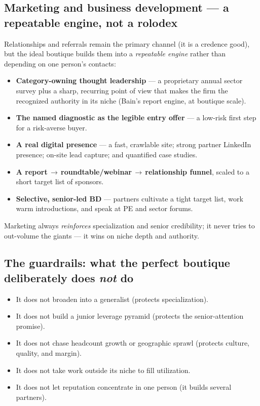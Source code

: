 \documentclass[11pt]{article}
\begin{document}
\subsection{Marketing and business development --- a repeatable engine, not a rolodex}
Relationships and referrals remain the primary channel (it is a credence good), but the
ideal boutique builds them into a \emph{repeatable engine} rather than depending on one
person's contacts:
\begin{itemize}
  \item \textbf{Category-owning thought leadership} --- a proprietary annual sector survey
  plus a sharp, recurring point of view that makes the firm the recognized authority in its
  niche (Bain's report engine, at boutique scale).
  \item \textbf{The named diagnostic as the legible entry offer} --- a low-risk first step
  for a risk-averse buyer.
  \item \textbf{A real digital presence} --- a fast, crawlable site; strong partner LinkedIn
  presence; on-site lead capture; and quantified case studies.
  \item \textbf{A report\,$\to$\,roundtable/webinar\,$\to$\,relationship funnel}, scaled to
  a short target list of sponsors.
  \item \textbf{Selective, senior-led BD} --- partners cultivate a tight target list, work
  warm introductions, and speak at PE and sector forums.
\end{itemize}
Marketing always \emph{reinforces} specialization and senior credibility; it never tries to
out-volume the giants --- it wins on niche depth and authority.

\subsection{The guardrails: what the perfect boutique deliberately does \emph{not} do}
\begin{itemize}
  \item It does not broaden into a generalist (protects specialization).
  \item It does not build a junior leverage pyramid (protects the senior-attention promise).
  \item It does not chase headcount growth or geographic sprawl (protects culture, quality,
  and margin).
  \item It does not take work outside its niche to fill utilization.
  \item It does not let reputation concentrate in one person (it builds several partners).
\end{itemize}
\end{document}
